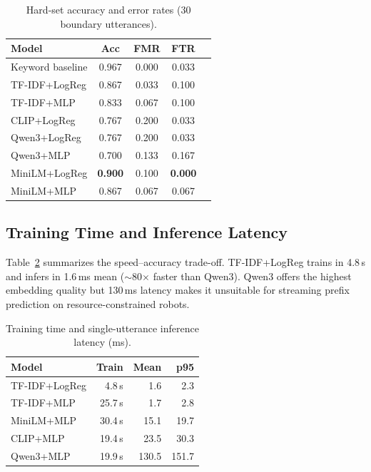 \documentclass{article}
\begin{document}
\begin{table}[h]
  \centering
  \caption{Hard-set accuracy and error rates (30 boundary utterances).}
  \label{tab:hard}
  \small
  \begin{tabular}{lcccc}
    \toprule
    Model & Acc & FMR & FTR \\
    \midrule
    Keyword baseline & 0.967 & 0.000 & 0.033 \\
    TF-IDF+LogReg    & 0.867 & 0.033 & 0.100 \\
    TF-IDF+MLP       & 0.833 & 0.067 & 0.100 \\
    CLIP+LogReg      & 0.767 & 0.200 & 0.033 \\
    Qwen3+LogReg     & 0.767 & 0.200 & 0.033 \\
    Qwen3+MLP        & 0.700 & 0.133 & 0.167 \\
    MiniLM+LogReg    & \textbf{0.900} & 0.100 & \textbf{0.000} \\
    MiniLM+MLP       & 0.867 & 0.067 & 0.067 \\
    \bottomrule
  \end{tabular}
\end{table}

\subsection{Training Time and Inference Latency}

Table~\ref{tab:latency} summarizes the speed--accuracy trade-off.
TF-IDF+LogReg trains in 4.8\,s and infers in 1.6\,ms mean ($\sim$80$\times$
faster than Qwen3).
Qwen3 offers the highest embedding quality but 130\,ms latency makes it
unsuitable for streaming prefix prediction on resource-constrained robots.

\begin{table}[h]
  \centering
  \caption{Training time and single-utterance inference latency (ms).}
  \label{tab:latency}
  \small
  \begin{tabular}{lrrr}
    \toprule
    Model & Train & Mean & p95 \\
    \midrule
    TF-IDF+LogReg  & 4.8\,s  & 1.6  & 2.3  \\
    TF-IDF+MLP     & 25.7\,s & 1.7  & 2.8  \\
    MiniLM+MLP     & 30.4\,s & 15.1 & 19.7 \\
    CLIP+MLP       & 19.4\,s & 23.5 & 30.3 \\
    Qwen3+MLP      & 19.9\,s & 130.5 & 151.7 \\
    \bottomrule
  \end{tabular}
\end{table}
\end{document}
